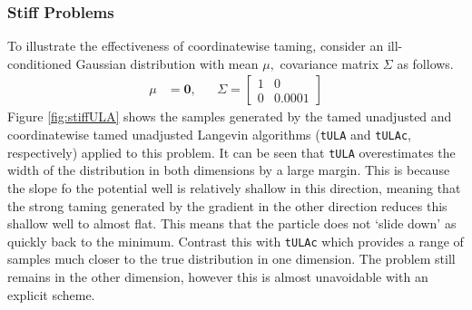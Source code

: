 \subsubsection{Stiff Problems}\label{sec:stiff}
To illustrate the effectiveness of coordinatewise taming, consider an ill-conditioned Gaussian distribution with mean \(\mu,\) covariance matrix \(\Sigma\) as follows.
\begin{align*}
    \mu &= \mathbf{0}, && \Sigma = \begin{bmatrix}  1 & 0 \\ 0 & 0.0001 \end{bmatrix}
\end{align*}
Figure \ref{fig:stiffULA} shows the samples generated by the tamed unadjusted and coordinatewise tamed unadjusted Langevin algorithms (\texttt{tULA} and \texttt{tULAc}, respectively) applied to this problem. It can be seen that \texttt{tULA} overestimates the width of the distribution in both dimensions by a large margin. This is because the slope fo the potential well is relatively shallow in this direction, meaning that the strong taming generated by the gradient in the other direction reduces this shallow well to almost flat. This means that the particle does not `slide down' as quickly back to the minimum. Contrast this with \texttt{tULAc} which provides a range of samples much closer to the true distribution in one dimension. The problem still remains in the other dimension, however this is almost unavoidable with an explicit scheme.  
